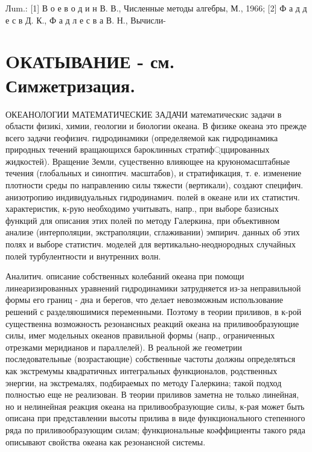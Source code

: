 \documentclass[10pt]{article}
\begin{document}
Лum.: [1] В о е в о д и н В. В., Численные методы алгебры, М., 1966; [2] Ф а д д е с в Д. К., Ф а д л е с в а В. Н., Вычисли-



\section{OКАТЫВАНИЕ - см. Симжетризация.}

ОКЕАНОЛОГИИ МАТЕМАТИЧЕСКИЕ ЗАДАЧИ математическис задачи в области физикі, химии, геологии и биологии океана. В физике океана это прежде всего задачи геофизич. гидродинамики (определяемоӥ как гидродинамика природных течений вращающихся бароклинных стратиф্ццированных жидкостей). Вращение Земли, суцественно влияющее на круюномасштабные течения (глобальных и синоптич. масштабов), и стратификация, т. е. изменение плотности среды по направлению силы тяжести (вертикали), создают специфич. анизотропию индивидуальных гидродинамич. полей в океане или их статистич. характеристик, к-рую необходимо учитывать, напр., при выборе базисных функций для описания этих полей по методу Галеркина, при объективном анализе (интерполяции, экстраполяции, сглаживании) эмпирич. данных об этих полях и выборе статистич. моделей для вертикально-неоднородных случайных полей турбулентности и внутренних волн.



Аналитич. описание собственных колебаний океана при помощи линеаризированных уравнений гидродинамики затрудняется из-за неправильной формы его границ - дна и берегов, что делает невозможным использование решений с разделяюшимися переменными. Поэтому в теории приливов, в к-рой существенна возможность резонансных реакций океана на приливообразующие силы, имег модельных океанов правильной формы (напр., ограниченных отрезками меридианов и параллелей). В реальной же геометрии последовательные (возрастающие) собственные частоты должны определяться как экстремумы квадратичных интегральных функционалов, родственных энергии, на экстремалях, подбираемых по методу Галеркина; такой подход полностью еще не реализован. В теории приливов заметна не только линейная, но и нелинейная реакция океана на приливообразующие силы, к-рая может быть описана при представлении высоты прилива в виде функционального степенного ряда по приливообразующим силам; функциональные коәффициенты такого ряда описывают свойства океана как резонансной системы.
\end{document}
